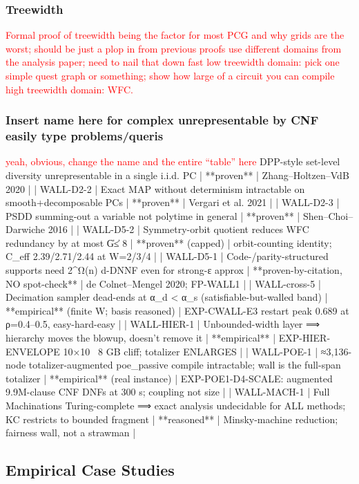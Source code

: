\documentclass[letterpaper]{article} %
\newcommand{\todo}[1]{\textcolor{red}{#1}}
\begin{document}
\subsubsection{Treewidth}
\todo{Formal proof of treewidth being the factor for most PCG and why grids are the worst; should be just a plop in from previous proofs}
\todo{use different domains from the analysis paper; need to nail that down fast}
\todo{low treewidth domain: pick one simple quest graph or something; show how large of a circuit you can compile}
\todo{high treewidth domain: WFC.}

\subsubsection{Insert name here for complex unrepresentable by CNF easily type problems/queris}
\todo{yeah, obvious, change the name and the entire ``table'' here}
DPP-style set-level diversity unrepresentable in a single i.i.d. PC | **proven** | Zhang–Holtzen–VdB 2020 |
| WALL-D2-2 | Exact MAP without determinism intractable on smooth+decomposable PCs | **proven** | Vergari et al. 2021 |
| WALL-D2-3 | PSDD summing-out a variable not polytime in general | **proven** | Shen–Choi–Darwiche 2016 |
| WALL-D5-2 | Symmetry-orbit quotient reduces WFC redundancy by at most \|G\| ≤ 8 | **proven** (capped) | orbit-counting identity; C_eff 2.39/2.71/2.44 at W=2/3/4 |
| WALL-D5-1 | Code-/parity-structured supports need 2^Ω(n) d-DNNF even for strong-ε approx | **proven-by-citation, NO spot-check** | de Colnet–Mengel 2020; FP-WALL1 |
| WALL-cross-5 | Decimation sampler dead-ends at α_d < α_s (satisfiable-but-walled band) | **empirical** (finite W; basis reasoned) | EXP-CWALL-E3 restart peak 0.689 at ρ=0.4–0.5, easy-hard-easy |
| WALL-HIER-1 | Unbounded-width layer ⟹ hierarchy moves the blowup, doesn't remove it | **empirical** | EXP-HIER-ENVELOPE 10×10 ~8 GB cliff; totalizer ENLARGES |
| WALL-POE-1 | ≈3,136-node totalizer-augmented poe_passive compile intractable; wall is the full-span totalizer | **empirical** (real instance) | EXP-POE1-D4-SCALE: augmented 9.9M-clause CNF DNFs at 300 s; coupling not size |
| WALL-MACH-1 | Full Machinations Turing-complete ⟹ exact analysis undecidable for ALL methods; KC restricts to bounded fragment | **reasoned** | Minsky-machine reduction; fairness wall, not a strawman |


\subsection{Empirical Case Studies}
\end{document}
